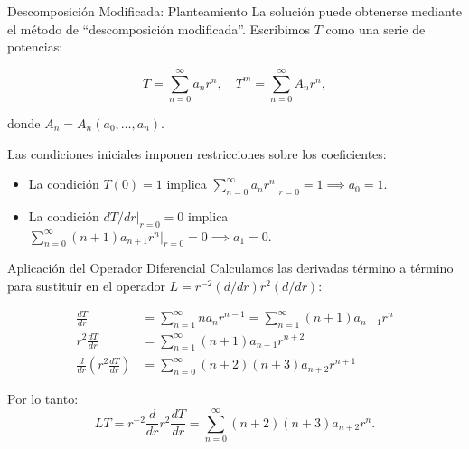\begin{frame}{Descomposición Modificada: Planteamiento}
    La solución puede obtenerse mediante el método de ``descomposición modificada''.
    Escribimos $T$ como una serie de potencias:

    \begin{equation}
        T=
        \sum_{n=0}^{\infty}
        a_{n} r^{n},\quad T^{m}=
        \sum_{n=0}^{\infty} A_{n} r^{n},
    \end{equation}

    donde $A_{n}=A_{n}(a_{0}, \dots, a_{n})$.

    Las condiciones iniciales imponen restricciones sobre los coeficientes:
    \begin{itemize}
        \item La condición $T(0)=1$ implica $\sum_{n=0}^{\infty} a_{n} r^{n}|_{r=0} = 1 \implies a_{0} = 1$.
        
        \item La condición $dT/dr|_{r=0} = 0$ implica $\sum_{n=0}^{\infty} (n+1)a_{n+1} r^{n}|_{r=0} = 0 \implies a_{1} = 0$.
    \end{itemize}
\end{frame}

\begin{frame}{Aplicación del Operador Diferencial}
    Calculamos las derivadas término a término para sustituir
    en el operador $L = r^{-2}(d/dr)r^{2}(d/dr)$:

    \begin{align*}
        \frac{dT}{dr}                               & = \sum_{n=1}^{\infty} n a_{n} r^{n-1} = \sum_{n=1}^{\infty} (n+1) a_{n+1} r^{n} \\
        r^{2}\frac{dT}{dr}                          & = \sum_{n=1}^{\infty} (n+1) a_{n+1} r^{n+2}                                     \\
        \frac{d}{dr}\left(r^{2}\frac{dT}{dr}\right) & = \sum_{n=0}^{\infty} (n+2)(n+3) a_{n+2} r^{n+1}
    \end{align*}

    Por lo tanto:
    \begin{equation}
        L T = r^{-2}\frac{d}{dr}r^{2}\frac{dT}{dr} = \sum_{n=0}^{\infty} (n+2)(n+3) a_{n+2} r^{n}.
    \end{equation}
\end{frame}


